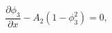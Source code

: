 \begin{equation}\label{dphi3} \frac{\partial \phi_3}{\partial
x}-A_2(1-\phi_3^2)=0,
\end{equation} 
